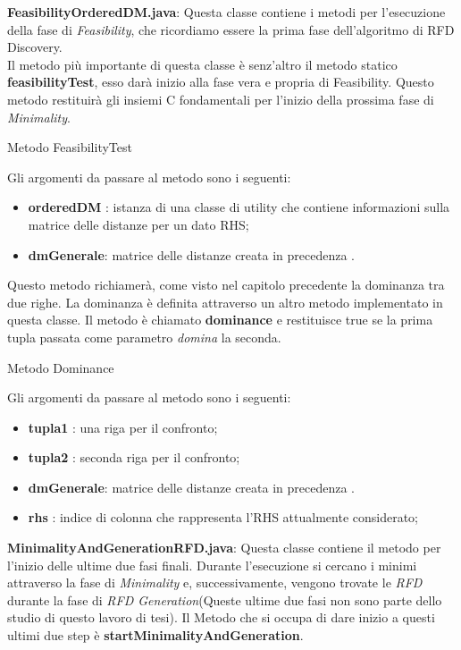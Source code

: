 \textbf{FeasibilityOrderedDM.java}:
Questa classe contiene i metodi per l'esecuzione della fase di \emph{Feasibility}, che ricordiamo essere la prima fase dell'algoritmo di RFD Discovery.\\
Il metodo più importante di questa classe è senz'altro il metodo statico \textbf{feasibilityTest}, esso darà inizio alla fase vera e propria di Feasibility.
Questo metodo restituirà gli insiemi C fondamentali per l'inizio della prossima fase di \emph{Minimality}.
\begin{listing}[H]
	\caption{Metodo FeasibilityTest}
	\label{Code:4}
\end{listing}
Gli argomenti da passare al metodo sono i seguenti:
\begin{itemize}
	\item \textbf{orderedDM} : istanza di una classe di utility che contiene informazioni sulla matrice delle distanze per un dato RHS;
	\item \textbf{dmGenerale}: matrice delle distanze creata in precedenza .
\end{itemize}
Questo metodo richiamerà, come visto nel capitolo precedente la dominanza tra due righe.
La dominanza è definita attraverso un altro metodo implementato in questa classe.
Il metodo è chiamato \textbf{dominance} e restituisce true se la prima tupla passata come parametro \emph{domina} la seconda.
\begin{listing}[H]
	\caption{Metodo Dominance}
	\label{Code:5}
\end{listing}
Gli argomenti da passare al metodo sono i seguenti:
\begin{itemize}
	\item \textbf{tupla1} : una riga per il confronto;
	\item \textbf{tupla2} : seconda riga per il confronto;
	\item \textbf{dmGenerale}: matrice delle distanze creata in precedenza .
	\item \textbf{rhs} : indice di colonna che rappresenta l'RHS attualmente considerato;
\end{itemize}
\textbf{MinimalityAndGenerationRFD.java}:
Questa classe contiene il metodo per l'inizio delle ultime due fasi finali.
Durante l'esecuzione si cercano i minimi attraverso la fase di \emph{Minimality} e, successivamente, vengono trovate le \emph{RFD} durante la fase di \emph{RFD Generation}(Queste ultime due fasi non sono parte dello studio di questo lavoro di tesi).
Il Metodo che si occupa di dare inizio a questi ultimi due step è \textbf{startMinimalityAndGeneration}.
